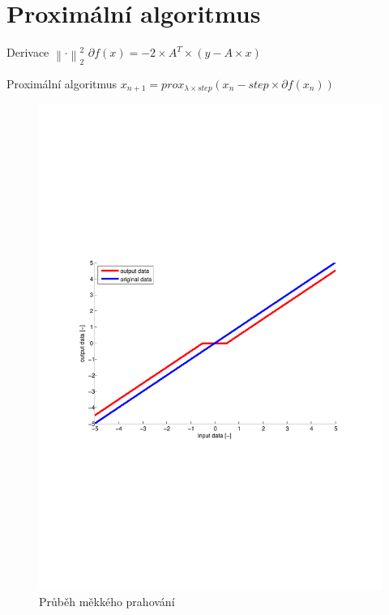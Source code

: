 \section{Proximální algoritmus}
\begin{frame}
	\vfill
	\begin{block}{Derivace $\left\| \cdot \right\|_{2}^{2} $}
		$\partial f(x) = -2 \times A^T \times (y-A \times x)$
	\end{block}
			\begin{block}{Proximální algoritmus}
				$x_{n+1} = prox_{\lambda \times step}(x_{n}- step \times \partial f(x_{n}))$
			\end{block}
\end{frame}
\begin{frame}
	\vfill
	\begin{figure}[!ht]
		\begin{center}
			\includegraphics[scale=0.6]{obr/threshhold.pdf}
		\end{center}
		\caption{Průběh měkkého prahování}
		\label{fig:nse}
	\end{figure}
\end{frame}
